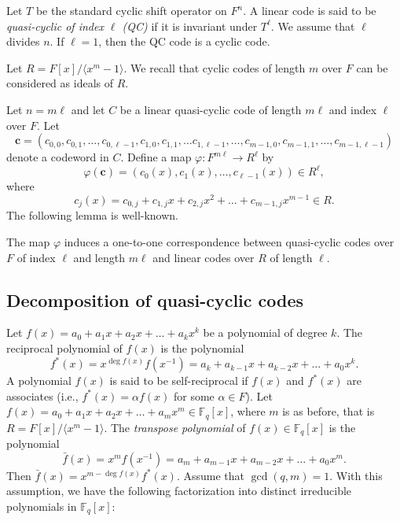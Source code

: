 \documentclass[a4paper,12pt]{article}
\begin{document}
 

 Let $T$ be the standard cyclic shift operator on $F^n$. 
 A linear code is said to be \textit{quasi-cyclic of index $\ell$ (QC)} if it is invariant under $T^\ell$. 
 We assume that $\ell$ divides $n$. If $\ell= 1$, then the QC code is a cyclic code.

Let $R = F[x]/\langle x^m-1\rangle$. We recall that cyclic codes of length $m$ over $F$ can be considered as ideals of $R$.

 Let $n = m\ell$ and let $C$ be a linear quasi-cyclic code of length $m \ell$ and index $\ell$ over $F$. Let
 \[
\mathbf{c} =(c_{0,0},  c_{0,1}, \dots,  c_{0,\ell-1},c_{1,0},  c_{1,1}, \dots  c_{1,\ell-1}, \dots, c_{m-1,0},  c_{m-1,1}, \dots,  c_{m-1,\ell-1})
 \]
denote a codeword in $C$. Define a map $\varphi: F^{m\ell} \rightarrow R^\ell$ by
\[
\varphi(\mathbf{c}) = (c_0(x), c_1(x), \dots, c_{\ell-1}(x)) \in R^\ell,
\]
where
\[
c_j(x) = c_{0,j}+c_{1,j}x+c_{2,j}x^2+ \dots + c_{m-1,j}x^{m-1} \in R.
\]
The following lemma is well-known.
 \begin{lemma} The map  $\varphi$ induces a one-to-one correspondence between quasi-cyclic
 codes over $F$ of index $\ell$ and length $m \ell$ and linear codes over $R$ of length $\ell$.
\end{lemma}


\subsection{Decomposition of quasi-cyclic codes}\label{subsection2.2}

 
Let $f(x) = a_0+a_1x+a_2x+ \dots + a_k x^k$ be a polynomial of degree $k$. The reciprocal polynomial of $f(x)$ is the polynomial
\[
f^*(x)=x^{\deg{f(x)}} f(x^{-1}) = a_k+a_{k-1}x+a_{k-2}x+ \dots + a_0 x^k.
\] 
A polynomial $f(x)$ is said to be self-reciprocal if $f(x)$ and $f^*(x)$ are associates (i.e., $f^*(x)=\alpha f(x)$ for some $\alpha\in F$). 
Let $f(x) = a_0+a_1x+a_2x+ \dots + a_{m} x^{m} \in \mathbb{F}_q[x]$, where $m$ is as before, that is $R= F[x]/\langle x^m-1 \rangle$. 
The   \textit{transpose polynomial} of $f(x)\in \mathbb{F}_q[x]$ is the polynomial
\[
\bar{f} (x) =x^{m} f(x^{-1}) = a_m+a_{m-1}x+a_{m-2}x+ \dots + a_0 x^m.
\]
Then $\bar{f}(x)=x^{m-\deg f(x)}f^*(x)$. Assume that $\gcd(q,m)=1$. With this assumption, we have the following factorization into distinct irreducible polynomials in $\mathbb{F}_q[x]$:
\end{document}
